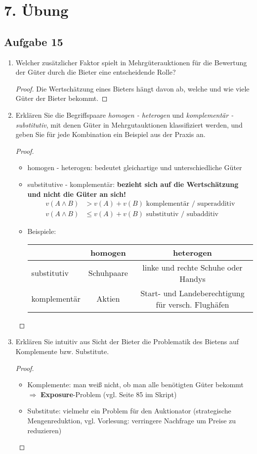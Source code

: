 \documentclass[12pt]{extreport} %
\theoremstyle{named}
\theoremstyle{nnamed}
\theoremstyle{itshape}
\theoremstyle{normal}
\begin{document}
\section*{7. Übung}

\subsection*{Aufgabe 15}

\begin{enumerate}
	\item Welcher zusätzlicher Faktor spielt in Mehrgüterauktionen für die Bewertung der Güter durch die Bieter eine entscheidende Rolle?
		\begin{proof}
			Die Wertschätzung eines Bieters hängt davon ab, welche und wie viele Güter der Bieter bekommt.
		\end{proof}
	\item Erklären Sie die Begriffspaare \textit{homogen - heterogen} und \textit{komplementär - substitutiv}, mit denen Güter in Mehrgutauktionen klassifiziert werden, und geben Sie für jede Kombination ein Beispiel aus der Praxis an.
		\begin{proof} ~\
			\begin{itemize}
				\item homogen - heterogen: bedeutet gleichartige und unterschiedliche Güter
				\item substitutive - komplementär: \textbf{bezieht sich auf die Wertschätzung und nicht die Güter an sich!}
					\begin{align*}
						v(A \wedge B ) & > v(A) + v(B) \text{ komplementär / superadditiv} \\
						v(A \wedge B ) & \leq v(A) + v(B) \text{ substitutiv / subadditiv}
					\end{align*}
				\item Beispiele: ~\\
					\begin{tabular}{l|cc}
  						     & homogen    & heterogen \\
  								\hline
 				substitutiv  & Schuhpaare & linke und rechte Schuhe oder Handys \\
 				komplementär &   Aktien         & Start- und Landeberechtigung für versch. Flughäfen
			\end{tabular}

			\end{itemize}
		\end{proof}
	\item Erklären Sie intuitiv aus Sicht der Bieter die Problematik des Bietens auf Komplemente bzw. Substitute.
		\begin{proof} ~\
			\begin{itemize}
				\item Komplemente: man weiß nicht, ob man alle benötigten Güter bekommt $\Rightarrow$ \textbf{Exposure}-Problem (vgl. Seite 85 im Skript)
				\item Substitute: vielmehr ein Problem für den Auktionator (strategische Mengenreduktion, vgl. Vorlesung: verringere Nachfrage um Preise zu reduzieren)
			\end{itemize}
		\end{proof}
\end{enumerate}
\end{document}
